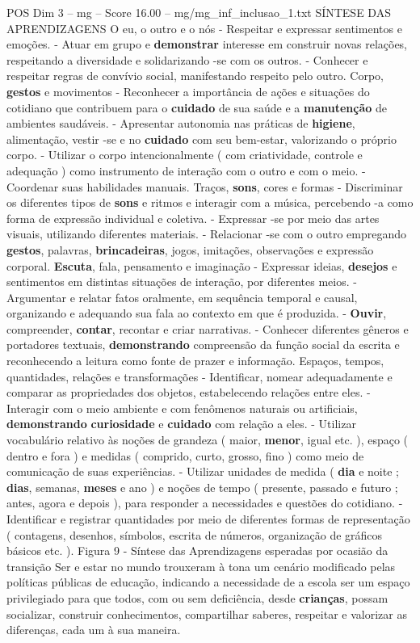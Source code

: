 \begin{textsample}{POS Dim 3 – mg – Score 16.00 – mg/mg\_inf\_inclusao\_1.txt}  \label{ex:f3_pos_266}
SÍNTESE DAS APRENDIZAGENS O eu, o outro e o nós - Respeitar e expressar sentimentos e emoções. - Atuar em grupo e \textbf{demonstrar} interesse em construir novas relações, respeitando a diversidade e solidarizando -se com os outros. - Conhecer e respeitar regras de convívio social, manifestando respeito pelo outro.
Corpo, \textbf{gestos} e movimentos - Reconhecer a importância de ações e situações do cotidiano que contribuem para o \textbf{cuidado} de sua saúde e a \textbf{manutenção} de ambientes saudáveis. - Apresentar autonomia nas práticas de \textbf{higiene}, alimentação, vestir -se e no \textbf{cuidado} com seu bem-estar, valorizando o próprio corpo. - Utilizar o corpo intencionalmente ( com criatividade, controle e adequação ) como instrumento de interação com o outro e com o meio. - Coordenar suas habilidades manuais.
Traços, \textbf{sons}, cores e formas - Discriminar os diferentes tipos de \textbf{sons} e ritmos e interagir com a música, percebendo -a como forma de expressão individual e coletiva. - Expressar -se por meio das artes visuais, utilizando diferentes materiais. - Relacionar -se com o outro empregando \textbf{gestos}, palavras, \textbf{brincadeiras}, jogos, imitações, observações e expressão corporal. \textbf{Escuta}, fala, pensamento e imaginação - Expressar ideias, \textbf{desejos} e sentimentos em distintas situações de interação, por diferentes meios. - Argumentar e relatar fatos oralmente, em sequência temporal e causal, organizando e adequando sua fala ao contexto em que é produzida. - \textbf{Ouvir}, compreender, \textbf{contar}, recontar e criar narrativas. - Conhecer diferentes gêneros e portadores textuais, \textbf{demonstrando} compreensão da função social da escrita e reconhecendo a leitura como fonte de prazer e informação.
Espaços, tempos, quantidades, relações e transformações - Identificar, nomear adequadamente e comparar as propriedades dos objetos, estabelecendo relações entre eles. - Interagir com o meio ambiente e com fenômenos naturais ou artificiais, \textbf{demonstrando} \textbf{curiosidade} e \textbf{cuidado} com relação a eles. - Utilizar vocabulário relativo às noções de grandeza ( maior, \textbf{menor}, igual etc. ), espaço ( dentro e fora ) e medidas ( comprido, curto, grosso, fino ) como meio de comunicação de suas experiências. - Utilizar unidades de medida ( \textbf{dia} e noite ; \textbf{dias}, semanas, \textbf{meses} e ano ) e noções de tempo ( presente, passado e futuro ; antes, agora e depois ), para responder a necessidades e questões do cotidiano. - Identificar e registrar quantidades por meio de diferentes formas de representação ( contagens, desenhos, símbolos, escrita de números, organização de gráficos básicos etc. ).
Figura 9 - Síntese das Aprendizagens esperadas por ocasião da transição Ser e estar no mundo trouxeram à tona um cenário modificado pelas políticas públicas de educação, indicando a necessidade de a escola ser um espaço privilegiado para que todos, com ou sem deficiência, desde \textbf{crianças}, possam socializar, construir conhecimentos, compartilhar saberes, respeitar e valorizar as diferenças, cada um à sua maneira.


\end{textsample}
